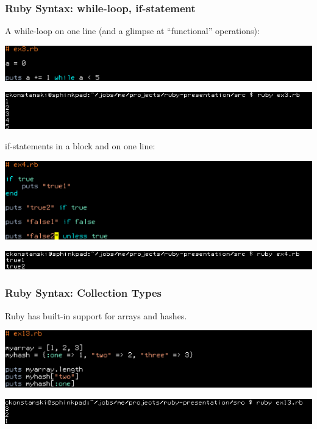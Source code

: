 \documentclass[helvetica,english,utf8,notitle,nologo]{beamer}
\begin{document}
\begin{frame}
  \frametitle{Ruby Syntax: while-loop, if-statement}

  A while-loop on one line (and a glimpse at ``functional'' operations):

  \includegraphics[scale=0.53]{src_3}

  \includegraphics[scale=0.5]{out_3}

  if-statements in a block and on one line:

  \includegraphics[scale=0.53]{src_4}

  \includegraphics[scale=0.5]{out_4}
\end{frame}

\begin{frame}
  \frametitle{Ruby Syntax: Collection Types}

  Ruby has built-in support for arrays and hashes.

  \includegraphics[scale=0.53]{src_13}

  \includegraphics[scale=0.5]{out_13}
\end{frame}
\end{document}
